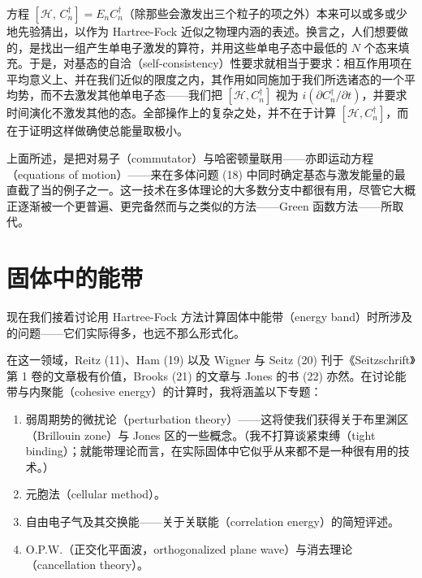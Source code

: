 

方程 $[\mathcal{H},\,C_n^{\dagger}] = E_n C_n^{\dagger}$（除那些会激发出三个粒子的项之外）本来可以或多或少地先验猜出，以作为 Hartree-Fock 近似之物理内涵的表述。换言之，人们想要做的，是找出一组产生单电子激发的算符，并用这些单电子态中最低的 $N$ 个态来填充。于是，对基态的自洽（self-consistency）性要求就相当于要求：相互作用项在平均意义上、并在我们近似的限度之内，其作用如同施加于我们所选诸态的一个平均势，而不去激发其他单电子态——我们把 $[\mathcal{H},C_n^{\dagger}]$ 视为 $i(\partial C_n^{\dagger}/\partial t)$，并要求时间演化不激发其他的态。全部操作上的复杂之处，并不在于计算 $[\mathcal{H},C_n^{\dagger}]$，而在于证明这样做确使总能量取极小。

上面所述，是把对易子（commutator）与哈密顿量联用——亦即运动方程（equations of motion）——来在多体问题 (18) 中同时确定基态与激发能量的最直截了当的例子之一。这一技术在多体理论的大多数分支中都很有用，尽管它大概正逐渐被一个更普遍、更完备然而与之类似的方法——Green 函数方法——所取代。

\section{固体中的能带}

现在我们接着讨论用 Hartree-Fock 方法计算固体中能带（energy band）时所涉及的问题——它们实际得多，也远不那么形式化。

在这一领域，Reitz (11)、Ham (19) 以及 Wigner 与 Seitz (20) 刊于《Seitzschrift》第 1 卷的文章极有价值，Brooks (21) 的文章与 Jones 的书 (22) 亦然。在讨论能带与内聚能（cohesive energy）的计算时，我将涵盖以下专题：

\begin{enumerate}
\item 弱周期势的微扰论（perturbation theory）——这将使我们获得关于布里渊区（Brillouin zone）与 Jones 区的一些概念。（我不打算谈紧束缚（tight binding）；就能带理论而言，在实际固体中它似乎从来都不是一种很有用的技术。）
\item 元胞法（cellular method）。
\item 自由电子气及其交换能——关于关联能（correlation energy）的简短评述。
\item O.P.W.（正交化平面波，orthogonalized plane wave）与消去理论（cancellation theory）。
\end{enumerate}

